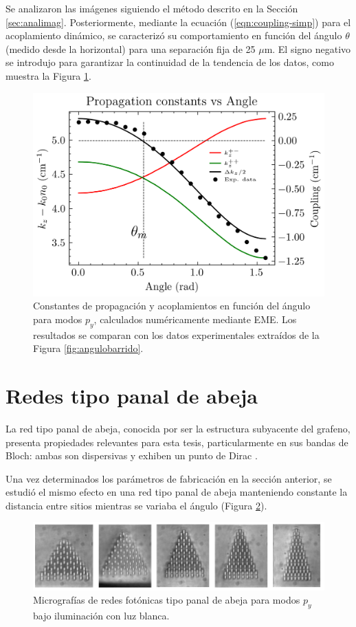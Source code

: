 Se analizaron las imágenes siguiendo el método descrito en la Sección \ref{sec:analimag}. Posteriormente, mediante la ecuación (\ref{eqn:coupling-simp}) para el acoplamiento dinámico, se caracterizó su comportamiento en función del ángulo $\theta$ (medido desde la horizontal) para una separación fija de 25 $\mu$m. El signo negativo se introdujo para garantizar la continuidad de la tendencia de los datos, como muestra la Figura \ref{fig:invisibility-coup}.

\begin{figure}[H]
    \centering
    \includegraphics[width=0.7\linewidth]{codigo/eigenvalues_vs_angle.png}
    \caption[Constantes de propagación y acoplamientos angulares para modos P]{Constantes de propagación y acoplamientos en función del ángulo para modos $p_y$, calculados numéricamente mediante EME. Los resultados se comparan con los datos experimentales extraídos de la Figura \ref{fig:angulobarrido}. \label{fig:invisibility-coup}}
\end{figure}

\section{Redes tipo panal de abeja}

La red tipo panal de abeja, conocida por ser la estructura subyacente del grafeno, presenta propiedades relevantes para esta tesis, particularmente en sus bandas de Bloch: ambas son dispersivas y exhiben un punto de Dirac \citep{honeycombdirac}.

Una vez determinados los parámetros de fabricación en la sección anterior, se estudió el mismo efecto en una red tipo panal de abeja manteniendo constante la distancia entre sitios mientras se variaba el ángulo (Figura \ref{fig:HCLBW}).

\begin{figure}[H]
    \centering
    \includegraphics[width=\linewidth]{media/honeycomb_lattices_bw.png}
    \caption[Micrografías de redes fotónicas tipo panal de abeja para modos P]{Micrografías de redes fotónicas tipo panal de abeja para modos $p_y$ bajo iluminación con luz blanca. \label{fig:HCLBW}}
\end{figure}


